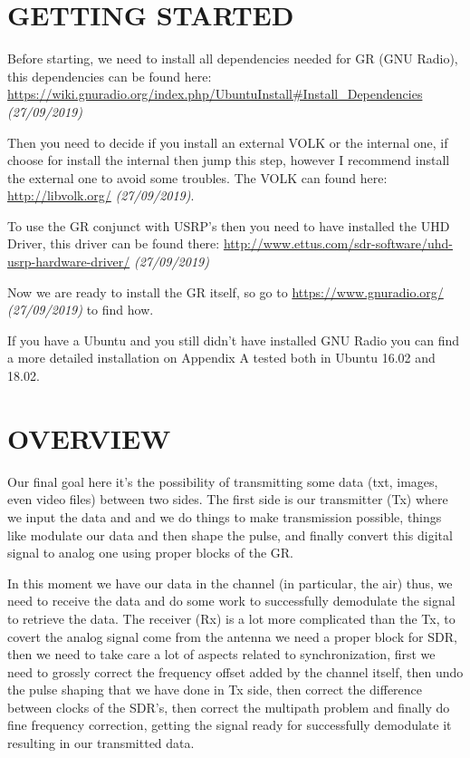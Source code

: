 \documentclass[a4paper, 10pt, conference]{ieeeconf}      %
\begin{document}
\section{GETTING STARTED}
Before starting, we need to install all dependencies needed for GR (GNU Radio), this dependencies can be found here: \url{https://wiki.gnuradio.org/index.php/UbuntuInstall#Install_Dependencies}\textit{ (27/09/2019)}

Then you need to decide if you install an external VOLK or the internal one, if choose for install the internal then jump this step, however I recommend install the external one to avoid some troubles. The VOLK can found here: \url{http://libvolk.org/} \textit{(27/09/2019)}.

To use the GR conjunct with USRP's then you need to have installed the UHD Driver, this driver can be found there: \url{http://www.ettus.com/sdr-software/uhd-usrp-hardware-driver/} \textit{(27/09/2019)}

Now we are ready to install the GR itself, so go to \url{https://www.gnuradio.org/} \textit{(27/09/2019)} to find how.

If you have a Ubuntu and you still didn't have installed GNU Radio you can find a more detailed installation on Appendix A tested both in Ubuntu 16.02 and 18.02. 

\section{OVERVIEW}
    Our final goal here it's the possibility of transmitting some data (txt, images, even video files) between two sides. The first side is our transmitter (Tx) where we input the data and and we do things to make transmission possible, things like modulate our data and then shape the pulse, and finally convert this digital signal to analog one using proper blocks of the GR.
    
    In this moment we have our data in the channel (in particular, the air) thus, we need to receive the data and do some work to successfully demodulate the signal to retrieve the data. The receiver (Rx) is a lot more complicated than the Tx, to covert the analog signal come from the antenna we need a proper block for SDR, then we  need to take care a lot of aspects related to synchronization, first we need to grossly correct the frequency offset added by the channel itself, then undo the pulse shaping that we have done in Tx side, then correct the difference between clocks of the SDR's, then correct the multipath problem and finally do fine frequency correction, getting the signal ready for successfully demodulate it resulting in our transmitted data.  
    
\end{document}
